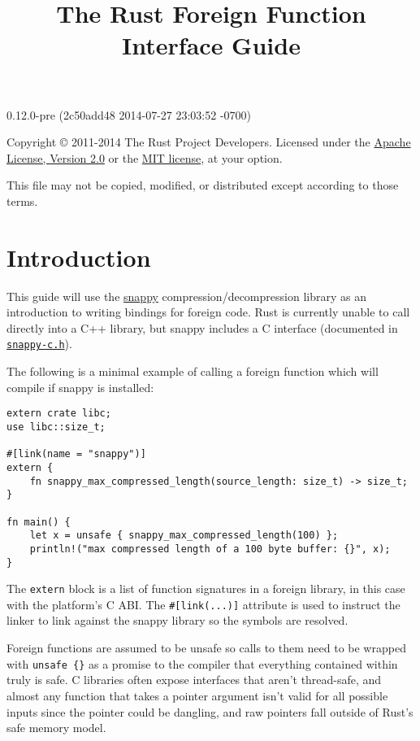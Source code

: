 \documentclass[]{article}
\title{The Rust Foreign Function Interface Guide}
\begin{document}
\maketitle

0.12.0-pre (2c50add48 2014-07-27 23:03:52 -0700)

Copyright © 2011-2014 The Rust Project Developers. Licensed under the
\href{http://www.apache.org/licenses/LICENSE-2.0}{Apache License,
Version 2.0} or the \href{http://opensource.org/licenses/MIT}{MIT
license}, at your option.

This file may not be copied, modified, or distributed except according
to those terms.

{
\hypersetup{linkcolor=black}
\setcounter{tocdepth}{3}
\tableofcontents
}
\section{Introduction}\label{introduction}

This guide will use the \href{https://github.com/google/snappy}{snappy}
compression/decompression library as an introduction to writing bindings
for foreign code. Rust is currently unable to call directly into a C++
library, but snappy includes a C interface (documented in
\href{https://github.com/google/snappy/blob/master/snappy-c.h}{\texttt{snappy-c.h}}).

The following is a minimal example of calling a foreign function which
will compile if snappy is installed:

\begin{verbatim}
extern crate libc;
use libc::size_t;

#[link(name = "snappy")]
extern {
    fn snappy_max_compressed_length(source_length: size_t) -> size_t;
}

fn main() {
    let x = unsafe { snappy_max_compressed_length(100) };
    println!("max compressed length of a 100 byte buffer: {}", x);
}
\end{verbatim}

The \texttt{extern} block is a list of function signatures in a foreign
library, in this case with the platform's C ABI. The
\texttt{\#{[}link(...){]}} attribute is used to instruct the linker to
link against the snappy library so the symbols are resolved.

Foreign functions are assumed to be unsafe so calls to them need to be
wrapped with \texttt{unsafe \{\}} as a promise to the compiler that
everything contained within truly is safe. C libraries often expose
interfaces that aren't thread-safe, and almost any function that takes a
pointer argument isn't valid for all possible inputs since the pointer
could be dangling, and raw pointers fall outside of Rust's safe memory
model.
\end{document}
